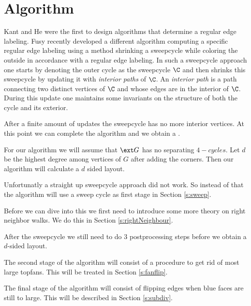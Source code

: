 
\section{Algorithm}
\label{s:algo}
Kant and He \cite{Kant1997} were the first to design algorithms that determine a regular edge labeling. Fusy \cite{Fusy2006} recently developed a different algorithm computing a specific regular edge labeling using a method shrinking a sweepcycle while coloring the outside in accordance with a regular edge labeling.
In such a sweepcycle approach one starts by denoting the outer cycle as the sweepcycle $\C$ and then shrinks this sweepcycle by updating it with \emph{interior paths} of $\C$. An \emph{interior path} is a path connecting two distinct vertices of $\C$ and whose edges are in the interior of $\C$. During this update one maintains some invariants on the structure of both the cycle and its exterior.

After a finite amount of updates the sweepcycle has no more interior vertices. At this point we can complete the algorithm and we obtain a \rel.

For our algorithm we will assume that $\ext G$ has no separating $4-cycles$. Let $d$ be the highest degree among vertices of $G$ after adding the corners. Then our algorithm will calculate a $d$ sided layout.

Unfortunatly a straight up sweepcycle approach did not work. So instead of that the algorithm will use a sweep cycle as first stage in Section \ref{s:sweep}.

Before we can dive into this we first need to introduce some more theory on right neighbor walks. We do this in Section \ref{s:rightNeighbour}.

After the sweepcycle we still need to do $3$ postprocessing steps before we obtain a $d$-sided layout.

The second stage of the algorithm will consist of a procedure to get rid of most large topfans. This will be treated in Section \ref{s:fanflip}.

The final stage of the algorithm will consist of flipping edges when blue faces are still to large. This will be described in Section \ref{s:subdiv}.
